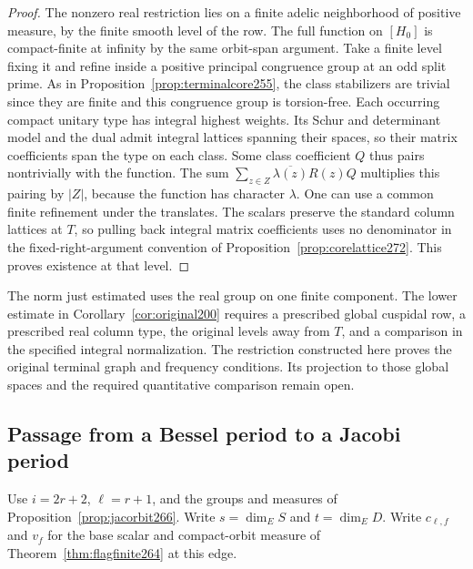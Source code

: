 \documentclass[a4paper,11pt]{article}
\theoremstyle{definition}
\theoremstyle{remark}
\numberwithin{equation}{section}
\begin{document}
\begin{proof}
The nonzero real restriction lies on a finite adelic
neighborhood of positive measure, by the finite smooth
level of the row. The full function on \([H_0]\) is
compact-finite at infinity by the same orbit-span argument.
Take a finite level fixing it and refine inside a positive
principal congruence group at an odd split prime. As in
Proposition~\ref{prop:terminalcore255}, the class stabilizers
are trivial since they are finite and this congruence group
is torsion-free. Each occurring compact unitary type has
integral highest weights. Its Schur and determinant model
and the dual admit integral lattices spanning their spaces,
so their matrix coefficients span the type on each class.
Some class coefficient \(Q\) thus pairs nontrivially with
the function. The sum \(\sum_{z\in Z}\overline{\lambda(z)}
R(z)Q\) multiplies this pairing by \(|Z|\), because the
function has character \(\lambda\). One can use a common
finite refinement under the translates. The scalars preserve
the standard column lattices at \(T\), so pulling back
integral matrix coefficients uses no denominator in the
fixed-right-argument convention of
Proposition~\ref{prop:corelattice272}. This proves existence
at that level.
\end{proof}

The norm just estimated uses the real group on one finite
component. The lower estimate in Corollary~\ref{cor:original200}
requires a prescribed global cuspidal row, a prescribed real
column type, the original levels away from \(T\), and a
comparison in the specified integral normalization. The
restriction constructed here proves the original terminal
graph and frequency conditions. Its projection to those
global spaces and the required quantitative comparison remain
open.

\subsection{Passage from a Bessel period to a Jacobi period}\label{nav:IV-39}
Use \(i=2r+2\), \(\ell=r+1\), and the groups and measures
of Proposition~\ref{prop:jacorbit266}. Write \(s=\dim_E S\)
and \(t=\dim_E D\). Write \(c_{\ell,f}\) and \(v_f\) for the
base scalar and compact-orbit measure of
Theorem~\ref{thm:flagfinite264} at this edge.
\end{document}

